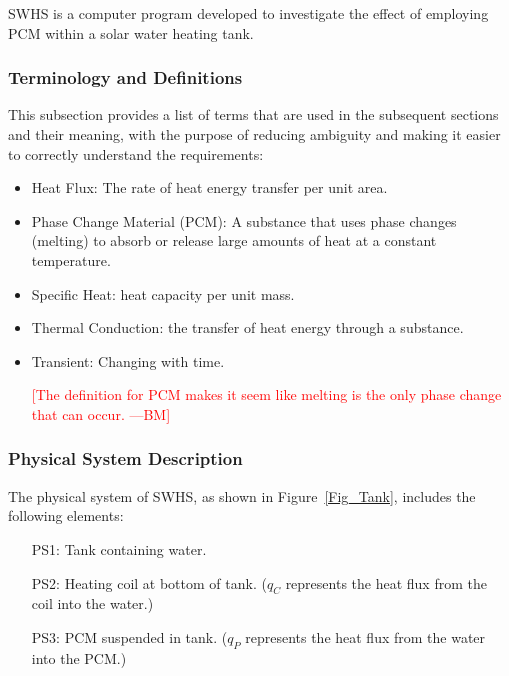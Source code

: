 \documentclass[12pt]{article}
\newcommand{\authornote}[3]{\textcolor{#1}{[#3 ---#2]}}
\newcommand{\authornote}[3]{}
\newcommand{\bmac}[1]{\authornote{red}{BM}{#1}}
\newcommand{\progname}{SWHS}
\begin{document}
\progname{} is a computer program developed to investigate the effect of
employing PCM within a solar water heating tank.


\subsubsection{Terminology and  Definitions}

This subsection provides a list of terms that are used in the subsequent
sections and their meaning, with the purpose of reducing ambiguity and making it
easier to correctly understand the requirements:

\begin{itemize}

\item Heat Flux: The rate of heat energy transfer per unit area.

\item Phase Change Material (PCM): A substance that uses phase changes (melting)
  to absorb or release large amounts of heat at a constant temperature.

\item Specific Heat: heat capacity per unit mass.

\item Thermal Conduction: the transfer of heat energy through a substance.

\item Transient: Changing with time.

\bmac{The definition for PCM makes it seem like melting is the only phase change that can occur.}

\end{itemize}

\subsubsection{Physical System Description}

The physical system of \progname{}, as shown in Figure~\ref{Fig_Tank},
includes the following elements:

\begin{itemize}

\item[PS1:] Tank containing water.

\item[PS2:] Heating coil at bottom of tank.  ($q_C$ represents the heat flux
  from the coil into the water.)

\item[PS3:] PCM suspended in tank.  ($q_P$ represents
  the heat flux from the water into the PCM.)

\end{itemize}
\end{document}
